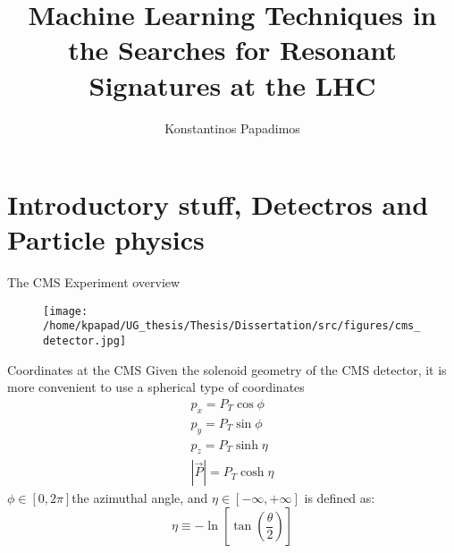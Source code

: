 \documentclass[bigger]{beamer}
\author{Konstantinos Papadimos}
\date{}
\title{Machine Learning Techniques in the Searches for Resonant Signatures at the LHC}
\begin{document}
\maketitle

\section{Introductory stuff, Detectros and Particle physics}
\label{sec:org9c9d2c1}
\begin{frame}[label={sec:orgcd3de1b}]{The CMS Experiment overview}
\begin{figure}[hb]
\centering
\texttt{[image: /home/kpapad/UG\_thesis/Thesis/Dissertation/src/figures/cms\_detector.jpg]}
\end{figure}
\end{frame}

\begin{frame}[label={sec:org5cabb5e}]{Coordinates at the CMS}
Given the solenoid geometry of the CMS detector, it is more convenient to use a spherical type of coordinates
\begin{equation}
\begin{matrix}
p_{x} = P_{T}\cos{\phi} \\
p_{y} = P_{T}\sin{\phi} \\
p_{z} = P_{T}\sinh{\eta}\\
|\vec{P}| = P_{T}\cosh{\eta} 
\end{matrix}
\end{equation}
\(\phi \in \left [ 0, 2\pi \right]\)the azimuthal angle, and \(\eta\in \left [ -\infty, +\infty \right ]\) is defined as:
\begin{equation}
\eta \equiv -\ln{\left [ \tan\left (\frac{\theta}{2} \right ) \right]  }
\end{equation}
\end{frame}
\end{document}
